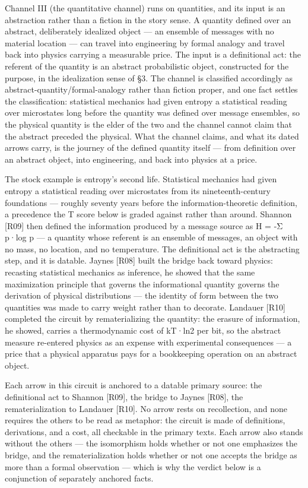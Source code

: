 \documentclass[11pt,a4paper]{article}
\begin{document}
Channel III (the quantitative channel) runs on quantities, and its input is an abstraction rather than a fiction in the story sense. A quantity defined over an abstract, deliberately idealized object — an ensemble of messages with no material location — can travel into engineering by formal analogy and travel back into physics carrying a measurable price. The input is a definitional act: the referent of the quantity is an abstract probabilistic object, constructed for the purpose, in the idealization sense of §3. The channel is classified accordingly as abstract-quantity/formal-analogy rather than fiction proper, and one fact settles the classification: statistical mechanics had given entropy a statistical reading over microstates long before the quantity was defined over message ensembles, so the physical quantity is the elder of the two and the channel cannot claim that the abstract preceded the physical. What the channel claims, and what its dated arrows carry, is the journey of the defined quantity itself — from definition over an abstract object, into engineering, and back into physics at a price.

The stock example is entropy's second life. Statistical mechanics had given entropy a statistical reading over microstates from its nineteenth-century foundations — roughly seventy years before the information-theoretic definition, a precedence the T score below is graded against rather than around. Shannon [R09] then defined the information produced by a message source as H = -Σ p·log p — a quantity whose referent is an ensemble of messages, an object with no mass, no location, and no temperature. The definitional act is the abstracting step, and it is datable. Jaynes [R08] built the bridge back toward physics: recasting statistical mechanics as inference, he showed that the same maximization principle that governs the informational quantity governs the derivation of physical distributions — the identity of form between the two quantities was made to carry weight rather than to decorate. Landauer [R10] completed the circuit by rematerializing the quantity: the erasure of information, he showed, carries a thermodynamic cost of kT·ln2 per bit, so the abstract measure re-entered physics as an expense with experimental consequences — a price that a physical apparatus pays for a bookkeeping operation on an abstract object.

Each arrow in this circuit is anchored to a datable primary source: the definitional act to Shannon [R09], the bridge to Jaynes [R08], the rematerialization to Landauer [R10]. No arrow rests on recollection, and none requires the others to be read as metaphor: the circuit is made of definitions, derivations, and a cost, all checkable in the primary texts. Each arrow also stands without the others — the isomorphism holds whether or not one emphasizes the bridge, and the rematerialization holds whether or not one accepts the bridge as more than a formal observation — which is why the verdict below is a conjunction of separately anchored facts.
\end{document}
